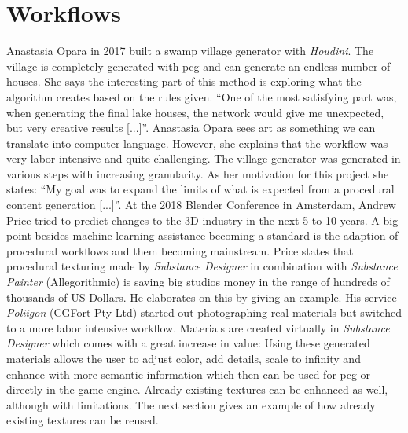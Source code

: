 \documentclass[10pt,a4paper]{article}
\begin{document}
\section{Workflows}\label{sec:workflows}
\begin{multicols}{2}
Anastasia Opara in 2017 built a swamp village generator with \textit{Houdini}. The village is completely generated with \gls{pcg} and can generate an endless number of houses. She says the interesting part of this method is exploring what the algorithm creates based on the rules given. “One of the most satisfying part was, when generating the final lake houses, the network would give me unexpected, but very creative results [...]”\cite{Opara2016}. Anastasia Opara sees art as something we can translate into computer language. However, she explains that the workflow was very labor intensive and quite challenging. The village generator was generated in various steps with increasing granularity. As her motivation for this project she states: “My goal was to expand the limits of what is expected from a procedural content generation [...]”\cite{Opara2017}. At the 2018 Blender Conference in Amsterdam, Andrew Price tried to predict changes to the 3D industry in the next 5 to 10 years. A big point besides machine learning assistance becoming a standard is the adaption of procedural workflows and them becoming mainstream\cite{Price2018}. Price states that procedural texturing made by \textit{Substance Designer} in combination with \textit{Substance Painter} (Allegorithmic) is saving big studios money in the range of hundreds of thousands of US Dollars. He elaborates on this by giving an example. His service \textit{Poliigon} (CGFort Pty Ltd) started out photographing real materials but switched to a more labor intensive workflow. Materials are created virtually in \textit{Substance Designer} which comes with a great increase in value: Using these generated materials allows the user to adjust color, add details, scale to infinity and enhance with more semantic information which then can be used for \gls{pcg} or directly in the game engine. Already existing textures can be enhanced as well, although with limitations. The next section gives an example of how already existing textures can be reused.
\end{multicols}
\end{document}
